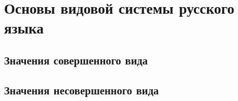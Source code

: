 \section{Основы видовой системы русского языка}



\subsection{Значения совершенного вида}

\subsection{Значения несовершенного вида}

